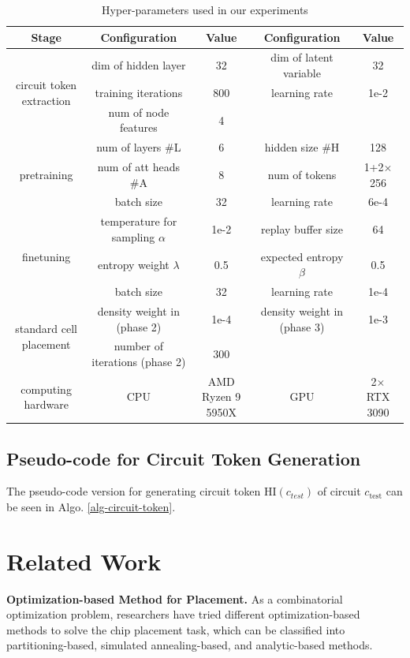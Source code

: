 \documentclass{article}
\theoremstyle{plain}
\theoremstyle{definition}
\theoremstyle{remark}
\begin{document}
\begin{table}[!htb]
	\caption{Hyper-parameters used in our experiments}
	\label{configuration-tab}
    \centering
    \small
    \begin{tabular}{c|cc|cc}
    \toprule
        Stage & Configuration & Value &Configuration & Value\\ \midrule
        \multirow{3}{*}{circuit token extraction} & dim of hidden layer & 32 & dim of latent variable & 32  \\ 
        ~ &training iterations & 800 & learning rate & 1e-2\\ 
        ~ &num of node features & 4 & ~ & ~\\ \midrule
         \multirow{3}{*}{pretraining} & num of layers \#L & 6 & hidden size \#H & 128  \\ 
        ~ &num of att heads \#A & 8 & num of tokens & 1+2$\times$256\\
        ~ & batch size & 32 & learning rate & 6e-4\\ \midrule
         \multirow{3}{*}{finetuning} & temperature for sampling $\alpha$ & 1e-2 & replay buffer size  & 64  \\ 
         ~ & entropy weight $\lambda$ & 0.5 & expected entropy $\beta$& 0.5\\
        ~ &batch size & 32 & learning rate & 1e-4\\ \midrule
        \multirow{2}{*}{standard cell placement} & density weight in (phase 2)& 1e-4 & density weight in (phase 3)& 1e-3 \\
        ~ & number of iterations (phase 2) & 300\\ \midrule
         computing hardware & CPU & AMD Ryzen 9 5950X&  GPU & 2$\times$ RTX 3090\\
        \bottomrule
    \end{tabular}
\end{table}

\subsection{Pseudo-code for Circuit Token Generation}
The pseudo-code version for generating circuit token $\text{HI}(c_{test})$ of circuit $c_{\text{test}}$ can be seen in Algo. \ref{alg-circuit-token}.




\section{Related Work}
\textbf{Optimization-based Method for Placement.}
As a combinatorial optimization problem, researchers have tried different optimization-based methods to solve the chip placement task, which can be classified into partitioning-based, simulated annealing-based, and analytic-based methods. 
\end{document}
